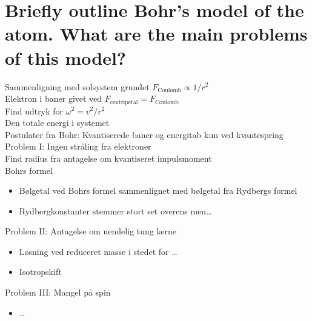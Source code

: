 \section{Briefly outline Bohr's model of the atom. What are the main problems of this model?}

\noindent
\large
Sammenligning med solsystem grundet $F_\text{Coulomb} \propto 1/r^2$\\
Elektron i baner givet ved $F_\text{centripetal} = F_\text{Coulomb}$\\
Find udtryk for $\omega^2 = v^2/r^2$\\
Den totale energi i systemet\\
Postulater fra Bohr: Kvantiserede baner og energitab kun ved kvantespring\\
Problem I: Ingen stråling fra elektroner\\
Find radius fra antagelse om kvantiseret impulsmoment\\
Bohrs formel
\begin{itemize}
    \item Bølgetal ved Bohrs formel sammenlignet med bølgetal fra Rydbergs formel
    \item Rydbergkonstanter stemmer stort set overens men\ldots
\end{itemize}
Problem II: Antagelse om uendelig tung kerne
\begin{itemize}
    \item Løsning ved reduceret masse i stedet for \ldots
    \item Isotropskift
\end{itemize}
Problem III: Mangel på spin
\begin{itemize}
    \item \ldots
\end{itemize}
\normalsize